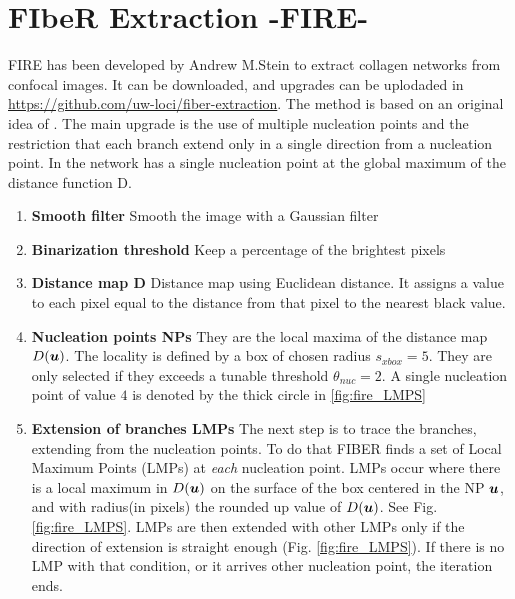  
 
 
\section{FIbeR Extraction -FIRE-}

FIRE has been developed by Andrew M.Stein
  \citep{stein_mathematical_2007} to extract collagen networks from confocal
  images. It can be downloaded, and upgrades can be uplodaded in
  \url{https://github.com/uw-loci/fiber-extraction}. The method
  \citep{stein_algorithm_2008} is based on an original idea of
  \citet{wu_automated_2003}. The main upgrade is the use of multiple nucleation points  and the restriction that each branch extend only  in a single direction from a nucleation point. In \citet{wu_automated_2003}  the
network has a single nucleation point at the global maximum of the distance function D.


 \begin{enumerate}[label=\textbf{\Alph*}]
 
 \item \textbf{Smooth filter} Smooth the image with a Gaussian filter
 \item \textbf{Binarization threshold} Keep a percentage of the brightest pixels
 \item \textbf{Distance map D} Distance map using Euclidean distance. It
 assigns a value to each pixel equal to the distance from that pixel to the nearest black value.

 \item \textbf{Nucleation points NPs} They are the
 local maxima of the distance map $D(\boldsymbol{u})$. The locality is defined by a
 box of chosen radius $s_{xbox}=5$. They are only selected if they
 exceeds a tunable threshold $\theta_{nuc}=2$. A single nucleation point of
 value $4$ is denoted by the thick circle in \ref{fig:fire_LMPS}
 
 \item \textbf{Extension of branches LMPs} The next step is to trace the
 branches, extending from the nucleation points. To do that FIBER finds a set of
 Local Maximum Points (LMPs) at \emph{each} nucleation point. LMPs occur where
 there is a local maximum in $D(\boldsymbol{u})$ on the surface of the box centered in the NP
 $\boldsymbol{u}$, and with radius(in pixels) the rounded up value of $D(\boldsymbol{u})$.
 See Fig. \ref{fig:fire_LMPS}. LMPs are then extended with other
 LMPs only if the direction of extension is straight enough
 (Fig. \ref{fig:fire_LMPS}). If there is no LMP with that
 condition, or it arrives other nucleation point, the iteration ends.
 \end{enumerate} 
     


